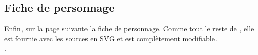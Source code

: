\subsection{Fiche de personnage}
Enfin, sur la page suivante la fiche de personnage. Comme tout le reste de \swr, elle est fournie avec les sources en SVG et est complètement modifiable.\\

\cite{swr-character-sheet-src}.

\clearpage

